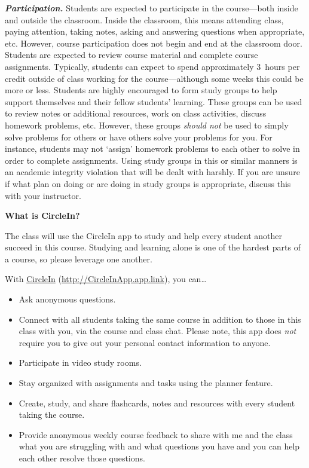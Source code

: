 \documentclass[11pt,letterpaper]{article}
\begin{document}
{\itshape\bfseries\color{scred}Participation.} 
Students are expected to participate in the course---both inside and outside the classroom. Inside the classroom, this means attending class, paying attention, taking notes, asking and answering questions when appropriate, etc. However, course participation does not begin and end at the classroom door. Students are expected to review course material and complete course assignments. Typically, students can expect to spend approximately 3~hours per credit outside of class working for the course---although some weeks this could be more or less. Students are highly encouraged to form study groups to help support themselves and their fellow students' learning. These groups can be used to review notes or additional resources, work on class activities, discuss homework problems, etc. However, these groups {\itshape should not} be used to simply solve problems for others or have others solve your problems for you. For instance, students may not `assign' homework problems to each other to solve in order to complete assignments. Using study groups in this or similar manners is an academic integrity violation that will be dealt with harshly. If you are unsure if what plan on doing or are doing in study groups is appropriate, discuss this with your instructor. \par\vspace{0.8cm}




{\bfseries What is CircleIn?} \par
The class will use the CircleIn app to study and help every student another succeed in this course. Studying and learning alone is one of the hardest parts of a course, so please leverage one another. \pspace

With \href{http://CircleInApp.app.link}{CircleIn} (\url{http://CircleInApp.app.link}), you can\dots
	\begin{itemize}
	\item Ask anonymous questions.
	\item Connect with all students taking the same course in addition to those in this class with you, via the course and class chat. Please note, this app does {\itshape not} require you to give out your personal contact information to anyone.
	\item Participate in video study rooms.
	\item Stay organized with assignments and tasks using the planner feature.
	\item Create, study, and share flashcards, notes and resources with every student taking the course.
	\item Provide anonymous weekly course feedback to share with me and the class what you are struggling with and what questions you have and you can help each other resolve those questions. 
	\end{itemize}
\end{document}
